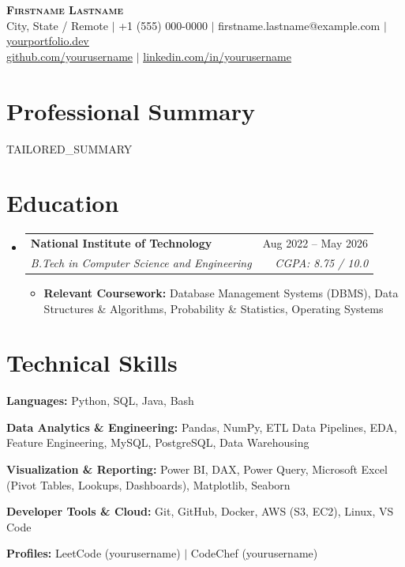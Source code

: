 \documentclass[letterpaper,11pt]{article}
\makeatletter
\newcommand{\resumeItem}[1]{
  \item\small{
    {#1 \vspace{-1pt}}
  }
}
\newcommand{\resumeSubheading}[4]{
  \vspace{-2pt}\item
    \begin{tabularx}{\textwidth}{@{}X r@{}}
      \textbf{#1} & #2 \\
      \textit{\small#3} & \textit{\small #4} \\
    \end{tabularx}\vspace{-6pt}
}
\newcommand{\resumeSubHeadingListStart}{\begin{itemize}[leftmargin=0pt, label={}]\vspace{-2pt}}
\newcommand{\resumeSubHeadingListEnd}{\end{itemize}\vspace{-3pt}}
\newcommand{\resumeItemListStart}{\begin{itemize}[leftmargin=*, itemsep=1.0pt, parsep=0pt]}
\newcommand{\resumeItemListEnd}{\end{itemize}\vspace{-5pt}}
\makeatother
\begin{document}
\begin{center}
    \textbf{\Huge \scshape Firstname Lastname} \\ \vspace{2pt}
    \small City, State / Remote $|$ +1 (555) 000-0000 $|$ firstname.lastname@example.com $|$ \href{https://yourportfolio.dev}{\underline{yourportfolio.dev}} \\ \vspace{1pt}
    \small \href{https://github.com/yourusername}{\underline{github.com/yourusername}} $|$ \href{https://linkedin.com/in/yourusername}{\underline{linkedin.com/in/yourusername}}
\end{center}

\section{Professional Summary}
 \begin{itemize}[leftmargin=0pt, label={}]\vspace{-3pt}
    \small{\item{
     {{TAILORED_SUMMARY}}
    }}
 \end{itemize}\vspace{-3pt}

\section{Education}
  \resumeSubHeadingListStart
    \resumeSubheading
      {National Institute of Technology}{Aug 2022 -- May 2026}
      {B.Tech in Computer Science and Engineering}{CGPA: 8.75 / 10.0}
      \resumeItemListStart
        \resumeItem{\textbf{Relevant Coursework:} Database Management Systems (DBMS), Data Structures \& Algorithms, Probability \& Statistics, Operating Systems}
      \resumeItemListEnd
  \resumeSubHeadingListEnd

\section{Technical Skills}
 \begin{itemize}[leftmargin=0pt, label={}, itemsep=2.0pt, parsep=0pt]\vspace{-3pt}
    \small{
      \item \textbf{Languages:} Python, SQL, Java, Bash
      \item \textbf{Data Analytics \& Engineering:} Pandas, NumPy, ETL Data Pipelines, EDA, Feature Engineering, MySQL, PostgreSQL, Data Warehousing
      \item \textbf{Visualization \& Reporting:} Power BI, DAX, Power Query, Microsoft Excel (Pivot Tables, Lookups, Dashboards), Matplotlib, Seaborn
      \item \textbf{Developer Tools \& Cloud:} Git, GitHub, Docker, AWS (S3, EC2), Linux, VS Code
      \item \textbf{Profiles:} LeetCode (yourusername) $|$ CodeChef (yourusername)
    }
 \end{itemize}\vspace{-3pt}
\end{document}
